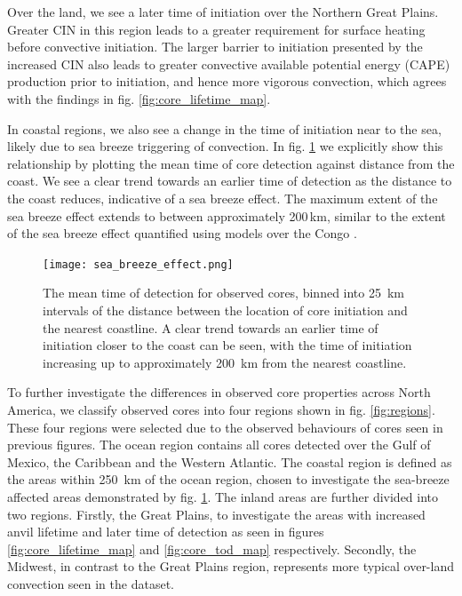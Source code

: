 Over the land, we see a later time of initiation over the Northern Great Plains.
Greater CIN in this region leads to a greater requirement for surface heating before convective initiation.
The larger barrier to initiation presented by the increased CIN also leads to greater convective available potential energy (CAPE) production prior to initiation, and hence more vigorous convection, which agrees with the findings in fig. \ref{fig:core_lifetime_map}.

In coastal regions, we also see a change in the time of initiation near to the sea, likely due to sea breeze triggering of convection.
In fig. \ref{fig:sea_breeze_effect} we explicitly show this relationship by plotting the mean time of core detection against distance from the coast.
We see a clear trend towards an earlier time of detection as the distance to the coast reduces, indicative of a sea breeze effect.
The maximum extent of the sea breeze effect extends to between approximately 200\,\unit{km}, similar to the extent of the sea breeze effect quantified using models over the Congo \citep{park_environmental_2020}.

\begin{figure}[t]
    \centering
    \texttt{[image: sea\_breeze\_effect.png]}
    \caption{The mean time of detection for observed cores, binned into 25~km intervals of the distance between the location of core initiation and the nearest coastline. A clear trend towards an earlier time of initiation closer to the coast can be seen, with the time of initiation increasing up to approximately 200~km from the nearest coastline.}
    \label{fig:sea_breeze_effect}
\end{figure}

To further investigate the differences in observed core properties across North America, we classify observed cores into four regions shown in fig. \ref{fig:regions}.
These four regions were selected due to the observed behaviours of cores seen in previous figures.
The ocean region contains all cores detected over the Gulf of Mexico, the Caribbean and the Western Atlantic.
The coastal region is defined as the areas within 250~km of the ocean region, chosen to investigate the sea-breeze affected areas demonstrated by fig. \ref{fig:sea_breeze_effect}.
The inland areas are further divided into two regions.
Firstly, the Great Plains, to investigate the areas with increased anvil lifetime and later time of detection as seen in figures \ref{fig:core_lifetime_map} and \ref{fig:core_tod_map} respectively.
Secondly, the Midwest, in contrast to the Great Plains region, represents more typical over-land convection seen in the dataset.

